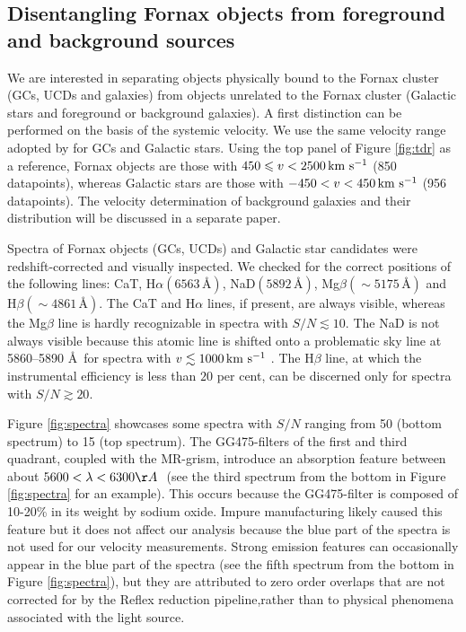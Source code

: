 \documentclass[useAMS,usenatbib]{mn2e}
\newcommand{\kms}{\mbox{\,km~s$^{-1}$}}
\begin{document}
\subsection{Disentangling Fornax objects from foreground and background 
sources}

We are interested in separating objects physically bound to the Fornax cluster 
(GCs, UCDs and galaxies) from objects unrelated to the Fornax cluster (Galactic 
stars and foreground or background galaxies). A first distinction can be 
performed on the basis of the systemic velocity. We use the same velocity range 
adopted by \cite{Schuberth} for GCs and Galactic stars.
Using the top panel of Figure \ref{fig:tdr} as a reference, Fornax objects are 
those with $450 \le v <2500 \kms$ (850 datapoints), whereas Galactic stars are 
those with $-450<v<450 \kms$ (956 datapoints). The velocity determination of 
background galaxies and their distribution will be discussed in a separate 
paper.

Spectra of Fornax objects (GCs, UCDs) and Galactic star candidates were 
redshift-corrected and visually inspected. We checked for the correct positions of the 
following lines: CaT, H$\alpha (6563 \, \mbox{\AA})$, NaD$(5892 \, 
\mbox{\AA})$, Mg$\beta (\sim 5175 \, \mbox{\AA})$ and H$\beta (\sim 4861\, 
\mbox{\AA})$. The CaT and H$\alpha$ lines, if present, are always visible, 
whereas the Mg$\beta$ line is hardly recognizable in spectra with $S/N \lesssim 
10$. The NaD is not always visible because this atomic line is shifted onto a 
problematic sky line at 5860--5890 \AA\ for spectra with $v \lesssim 1000\kms$ . 
The H$\beta$ line, at which the instrumental efficiency is less than $20$ per 
cent, can be discerned only for spectra with $S/N \gtrsim 20 $.

Figure \ref{fig:spectra} showcases some spectra with $S/N$ ranging from 50 
(bottom spectrum) to 15 (top spectrum). 
The GG475-filters of the first and third quadrant, coupled with the MR-grism, 
introduce an absorption feature between about $5600 < \lambda < 6300 \AA\ $ 
(see the third spectrum from the bottom in Figure \ref{fig:spectra} for an 
example). This occurs because the GG475-filter is composed of 10-20\% in its 
weight by sodium oxide. Impure manufacturing likely caused this feature but it 
does not affect our analysis because the blue part of the spectra is not used 
for our velocity measurements. Strong emission features can occasionally appear 
in the blue part of the spectra (see the fifth spectrum from the bottom in 
Figure \ref{fig:spectra}), but they are attributed to zero order overlaps that 
are not corrected for by the Reflex reduction pipeline,rather than to physical 
phenomena associated with the light source. 
\end{document}
